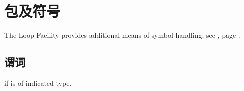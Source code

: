 %
%

\section{包及符号}
The Loop Facility provides additional means of symbol handling; see , page \pageref{section:Loop 宏}.

\subsection{谓词}
\begin{LIST}{1cm}

  {
    \retval{\T} if  is of indicated type.
  }

\end{LIST}


